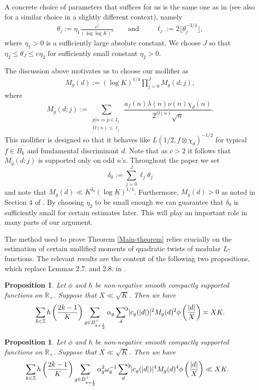 \documentclass[a4paper,10pt,twoside]{amsart}
\newtheorem{prop}[theorem]{Proposition}
\theoremstyle{definition}
\numberwithin{equation}{section}
\newcommand\Z{\mathbb{Z}}
\renewcommand\:{\colon}
\newcommand{\sumflat}{\mathop{{\sum}^{\raisebox{-3pt}{\makebox[0pt][l]{$\flat$}}}}}
\begin{document}
A concrete choice of parameters that suffices for us is the same one as in \cite{Lester-Radziwill2021} (see also \cite{Bui-Evans-Lester-Pratt2022} for a similar choice in a slightly different context), namely
\begin{align*}
\theta_j:=\eta_1\frac{e^j}{(\log\log K)^5} \qquad \text{and }\qquad \ell_j:=2\lfloor \theta_j^{-3/4}\rfloor,
\end{align*}
where $\eta_1>0$ is a sufficiently large absolute constant. We choose $J$ so that $\eta_2\leq\theta_J\leq e\eta_2$ for sufficiently small constant $\eta_2>0$. 

The discussion above motivates us to choose our mollifier as
\begin{align}\label{mollifier}
M_g(d):=(\log K)^{1/4}\prod_{j=0}^J M_g(d;j), 
\end{align}
where 
\[ 
M_g(d;j):=\sum_{\substack{p|n\Rightarrow p\in I_j\\
\Omega(n)\leq\ell_j}}\frac{a_f(n)\lambda(n)\nu(n)\chi_d(n)}{2^{\Omega(n)}\sqrt n}.\]
This mollifier is designed so that it behaves like $L(1/2,f\otimes \chi_d)^{-1/2}$ for typical $f\in B_{k}$ and fundamental discriminant $d$. Note that as $c>2$ it follows that $M_g(d;j)$ is supported only on odd $n$'s. Throughout the paper we set 
\[ 
\delta_0:=\sum_{j=0}^J\ell_j\theta_j
\]
and note that $M_g(d)\ll K^{\delta_0}(\log K)^{1/4}$. Furthermore, $M_g(d)>0$ as noted in Section $4$ of \cite{Lester-Radziwill2021}. By choosing $\eta_2$ to be small enough we can guarantee that $\delta_0$ is sufficiently small for certain estimates later. This will play an important role in many parts of our argument. 

The method used to prove Theorem \ref{Main-theorem} relies crucially on the estimation of certain mollified moments of quadratic twists of modular $L$-functions. The relevant results are the content of the following two propositions, which replace Lemmas 2.7. and 2.8. in \cite{Jaasaari2026}.

\begin{prop}\label{second-moment-with-average}
Let $\phi$ and $h$ be non-negative smooth compactly supported functions on $\mathbb R_+$. Suppose that $X\ll\sqrt K$. Then we have 
\[\sum_{k\in\Z}h\left(\frac{2k-1}K\right)\sum_{g\in B^+_{k+\frac12}}\alpha_g\sumflat_d\, |c_g(|d|)|^2 M_g(d)^2\phi\left(\frac{|d|}X\right)\asymp XK. \]
\end{prop}

\begin{prop}\label{fourth-moment-with-average}
Let $\phi$ and $h$ be non-negative smooth compactly supported functions on $\mathbb R_+$. Suppose that $X\ll\sqrt K$. Then we have
\begin{align}\label{Fourth-moment}
&\sum_{k\in\Z}h\left(\frac{2k-1}K\right)\sum_{g\in B^+_{k+\frac12}}\alpha_g^2\omega_g^{-1}\sumflat_{d}\, |c_g(|d|)|^4 M_g(d)^4\phi\left(\frac{|d|}X\right)\ll XK. 
\end{align}
\end{prop}
\end{document}
